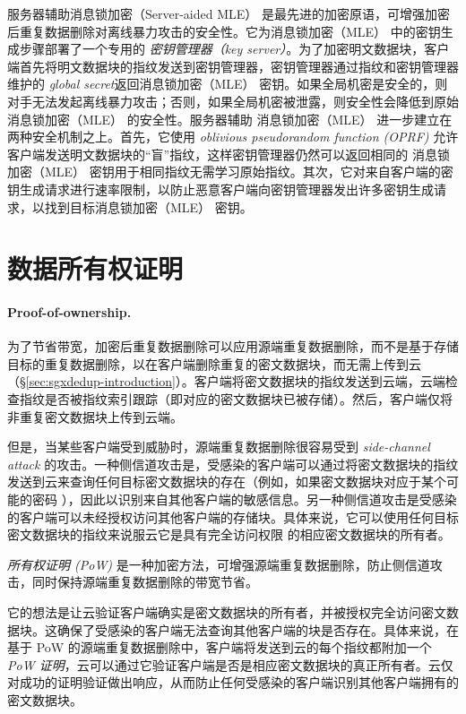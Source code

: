 服务器辅助消息锁加密（Server-aided MLE）\cite{bellare2013DupLESS} 是最先进的加密原语，可增强加密后重复数据删除对离线暴力攻击的安全性。它为消息锁加密（MLE） 中的密钥生成步骤部署了一个专用的 \textit{ 密钥管理器（key server）}。为了加密明文数据块，客户端首先将明文数据块的指纹发送到密钥管理器，密钥管理器通过指纹和密钥管理器维护的\textit{ global secret}返回消息锁加密（MLE） 密钥。如果全局机密是安全的，则对手无法发起离线暴力攻击；否则，如果全局机密被泄露，则安全性会降低到原始 消息锁加密（MLE） 的安全性。服务器辅助 消息锁加密（MLE） 进一步建立在两种安全机制之上。首先，它使用 \textit{ oblivious pseudorandom function (OPRF)} \cite{naor2004Number} 允许客户端发送明文数据块的“盲”指纹，这样密钥管理器仍然可以返回相同的 消息锁加密（MLE） 密钥用于相同指纹无需学习原始指纹。其次，它对来自客户端的密钥生成请求进行速率限制，以防止恶意客户端向密钥管理器发出许多密钥生成请求，以找到目标消息锁加密（MLE） 密钥。

\section{数据所有权证明}
\label{sec:background-pow}

\paragraph*{Proof-of-ownership.} 为了节省带宽，加密后重复数据删除可以应用源端重复数据删除，而不是基于存储目标的重复数据删除，以在客户端删除重复的密文数据块，而无需上传到云（\S\ref{sec:sgxdedup-introduction}）。客户端将密文数据块的指纹发送到云端，云端检查指纹是否被指纹索引跟踪（即对应的密文数据块已被存储）。然后，客户端仅将非重复密文数据块上传到云端。

但是，当某些客户端受到威胁时，源端重复数据删除很容易受到 \textit{ side-channel attack} \cite{harnik10,halevi11} 的攻击。一种侧信道攻击是，受感染的客户端可以通过将密文数据块的指纹发送到云来查询任何目标密文数据块的存在（例如，如果密文数据块对应于某个可能的密码 \cite{harnik10}），因此以识别来自其​​他客户端的敏感信息。另一种侧信道攻击是受感染的客户端可以未经授权访问其他客户端的存储块。具体来说，它可以使用任何目标密文数据块的指纹来说服云它是具有完全访问权限 \cite{halevi11} 的相应密文数据块的所有者。

\textit{ 所有权证明 (PoW)} \cite{halevi11} 是一种加密方法，可增强源端重复数据删除，防止侧信道攻击，同时保持源端重复数据删除的带宽节省。

它的想法是让云验证客户端确实是密文数据块的所有者，并被授权完全访问密文数据块。这确保了受感染的客户端无法查询其他客户端的块是否存在。具体来说，在基于 PoW 的源端重复数据删除中，客户端将发送到云的每个指纹都附加一个 \textit{ PoW 证明}，云可以通过它验证客户端是否是相应密文数据块的真正所有者。云仅对成功的证明验证做出响应，从而防止任何受感染的客户端识别其他客户端拥有的密文数据块。 

